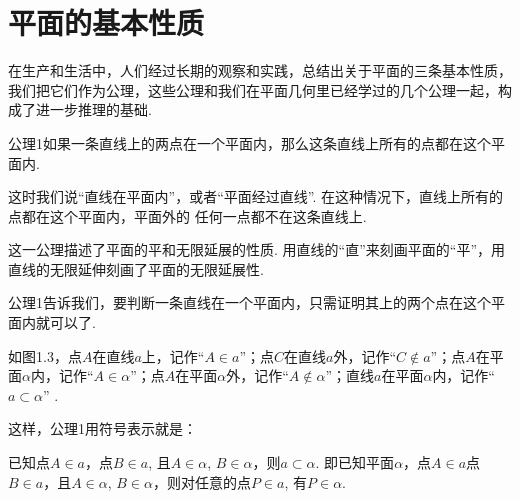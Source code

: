 \begin{enumerate}
\begin{minipage}{.45\textwidth}
\end{minipage}
\end{enumerate}

\section{平面的基本性质}
在生产和生活中，人们经过长期的观察和实践，总结出关于平面的三条基本性质，我们把它们作为公理，这些公理和我们在平面几何里已经学过的几个公理一起，构成了进一步推理的基础.

\begin{thm}
    {公理1}如果一条直线上的两点在一个平面内，那么这条直线上所有的点都在这个平面内.
\end{thm}

这时我们说“直线在平面内”，或者“平面经过直线”. 在这种情况下，直线上所有的点都在这个平面内，平面外的
任何一点都不在这条直线上.

这一公理描述了平面的平和无限延展的性质. 用直线的“直”来刻画平面的“平”，用直线的无限延伸刻画了平面的无限延展性.

公理1告诉我们，要判断一条直线在一个平面内，只需证明其上的两个点在这个平面内就可以了.

如图1.3，点$A$在直线$a$上，记作“$A\in a$”；点$C$在直线$a$外，记作“$C\notin a$”；点$A$在平面$\alpha$内，记作“$A\in\alpha$”；点$A$在平面$\alpha$外，记作“$A\notin \alpha$”；直线$a$在平面$\alpha$内，记作“$a\subset \alpha$”
.

这样，公理1用符号表示就是：

\begin{thm}{}
 已知点$A\in a$，点$B\in a$, 且$A\in \alpha$, $B\in\alpha$，则$a\subset\alpha$. 即已知平面$\alpha$，点$A\in a$点$B\in a$，且$A\in\alpha$, $B\in\alpha$，则对任意的点$P\in a$, 有$P\in \alpha$.   
\end{thm}


